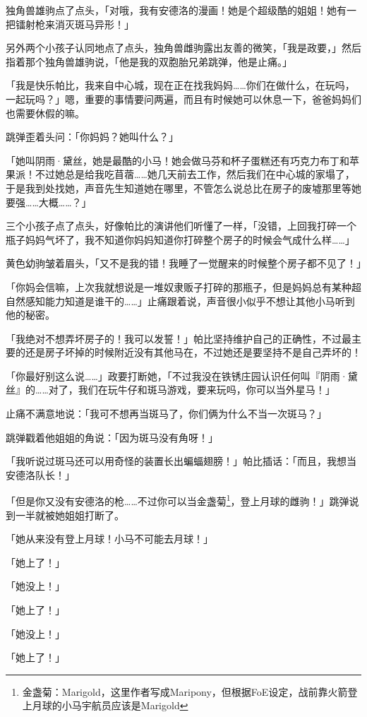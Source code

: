 独角兽雄驹点了点头，「对哦，我有安德洛的漫画！她是个超级酷的姐姐！她有一把镭射枪来消灭斑马异形！」

另外两个小孩子认同地点了点头，独角兽雌驹露出友善的微笑，「我是政要，」然后指着那个独角兽雄驹说，「他是我的双胞胎兄弟跳弹，他是止痛。」

「我是快乐帕比，我来自中心城，现在正在找我妈妈……你们在做什么，在玩吗，一起玩吗？」嗯，重要的事情要问两遍，而且有时候她可以休息一下，爸爸妈妈们也需要休假的嘛。

跳弹歪着头问：「你妈妈？她叫什么？」

「她叫阴雨·黛丝，她是最酷的小马！她会做马芬和杯子蛋糕还有巧克力布丁和苹果派！不过她总是给我吃苜蓿……她几天前去工作，然后我们在中心城的家塌了，于是我到处找她，声音先生知道她在哪里，不管怎么说总比在房子的废墟那里等她要强……大概……？」

三个小孩子点了点头，好像帕比的演讲他们听懂了一样，「没错，上回我打碎一个瓶子妈妈气坏了，我不知道你妈妈知道你打碎整个房子的时候会气成什么样……」

黄色幼驹皱着眉头，「又不是我的错！我睡了一觉醒来的时候整个房子都不见了！」

「你妈会信嘛，上次我就想说是一堆奴隶贩子打碎的那瓶子，但是妈妈总有某种超自然感知能力知道是谁干的……」止痛跟着说，声音很小似乎不想让其他小马听到他的秘密。

「我绝对不想弄坏房子的！我可以发誓！」帕比坚持维护自己的正确性，不过最主要的还是房子坏掉的时候附近没有其他马在，不过她还是要坚持不是自己弄坏的！

「你最好别这么说……」政要打断她，「不过我没在铁锈庄园认识任何叫『阴雨·黛丝』的……对了，我们在玩牛仔和斑马游戏，要来玩吗，你可以当外星马！」

止痛不满意地说：「我可不想再当斑马了，你们俩为什么不当一次斑马？」

跳弹戳着他姐姐的角说：「因为斑马没有角呀！」

「我听说过斑马还可以用奇怪的装置长出蝙蝠翅膀！」帕比插话：「而且，我想当安德洛队长！」

「但是你又没有安德洛的枪……不过你可以当金盏菊\footnote{金盏菊：Marigold，这里作者写成Maripony，但根据FoE设定，战前靠火箭登上月球的小马宇航员应该是Marigold}，登上月球的雌驹！」跳弹说到一半就被她姐姐打断了。

「她从来没有登上月球！小马不可能去月球！」

「她上了！」

「她没上！」

「她上了！」

「她没上！」

「她上了！」


